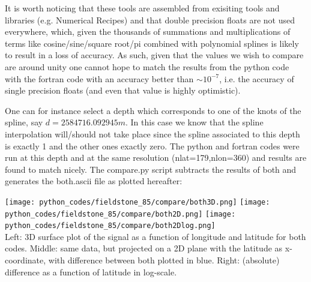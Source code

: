 It is worth noticing that these tools are assembled from exisiting tools and libraries (e.g. 
Numerical Recipes) and that double precision floats are not used everywhere, which, given the
thousands of summations and multiplications of terms like cosine/sine/square root/pi combined
with polynomial splines is likely 
to result in a loss of accuracy. As such, given that the values we wish to compare are around
unity one cannot hope to match the results from the python code with the fortran code with 
an accuracy better than $\sim 10^{-7}$, i.e. the accuracy of single precision floats  (and even 
that value is highly optimistic).

One can for instance select a depth which corresponds to one of the knots of the spline, 
say $d=2584716.092945\si{m}$.
In this case we know that the spline interpolation will/should not take place since the
spline associated to this depth is exactly 1 and the other ones exactly zero. 
The python and fortran codes were run at this depth and at the same resolution (nlat=179,nlon=360)
and results are found to match nicely. The {\filenamefont compare.py} script subtracts the results 
of both and generates the {\filenamefont both.ascii} file as plotted hereafter:
  

\begin{center}
\texttt{[image: python\_codes/fieldstone\_85/compare/both3D.png]}
\texttt{[image: python\_codes/fieldstone\_85/compare/both2D.png]}
\texttt{[image: python\_codes/fieldstone\_85/compare/both2Dlog.png]}\\
{\captionfont Left: 3D surface plot of the signal as a function of longitude and latitude for 
both codes. Middle: same data, but projected on a 2D plane with the latitude as x-coordinate, 
with difference between both plotted in blue. Right: (absolute) difference as a function 
of latitude in log-scale.}
\end{center}

